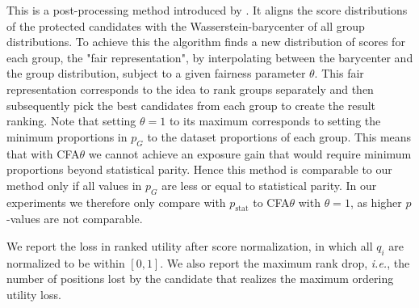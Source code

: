  This is a post-processing method introduced by \citet{zehlike2020matching}.
%
It aligns the score distributions of the protected candidates with the Wasserstein-barycenter of all group distributions.
%
To achieve this the algorithm finds a new distribution of scores for each group, the "fair representation", by interpolating between the barycenter and the group distribution, subject to a given fairness parameter $\theta$.
%
This fair representation corresponds to the idea to rank groups separately and then subsequently pick the best candidates from each group to create the result ranking.
%
Note that setting $\theta=1$ to its maximum corresponds to setting the minimum proportions in $p_G$ to the dataset proportions of each group.
%
This means that with CFA$\theta$ we cannot achieve an exposure gain that would require minimum proportions beyond statistical parity.
%
Hence this method is comparable to our method only if all values in $p_G$ are less or equal to statistical parity.
%
In our experiments we therefore only compare \algoFAIR with $p_{\text{stat}}$ to CFA$\theta$ with $\theta=1$, as higher $p$-values are not comparable.

\noindent{}

 We report the loss in ranked utility after score normalization, in which all $q_i$ are normalized to be within $[0, 1]$.
%
We also report the maximum rank drop, {\em i.e.}, the number of positions lost by the candidate that realizes the maximum ordering utility loss.


